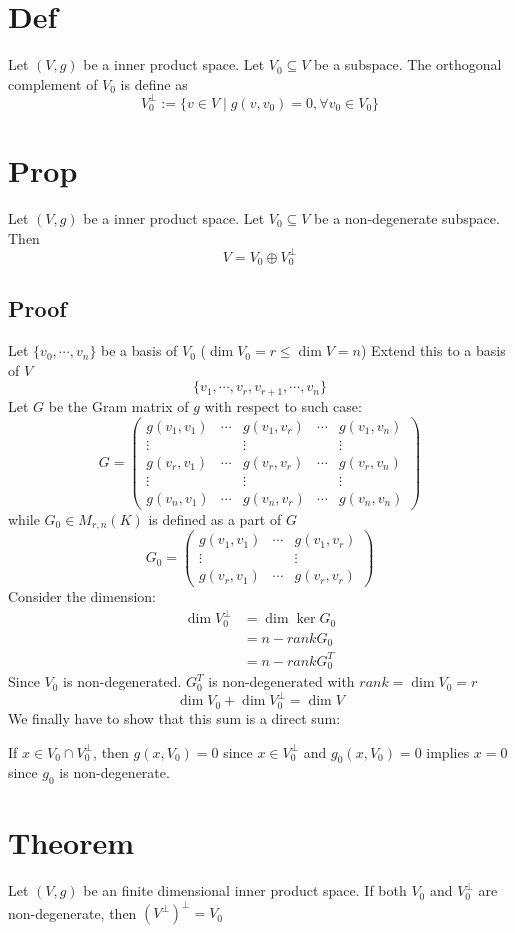 \documentclass{book}
\begin{document}
\section{Def}
Let $(V,g)$ be a inner product space. Let $V_0\subseteq V$ be a subspace. The orthogonal complement of $V_0$ is define as
$$V_0^\bot:=\{v\in V\mid g(v,v_0)=0,\forall v_0\in V_0\}$$
\section{Prop}
Let $(V,g)$ be a inner product space. Let $V_0\subseteq V$ be a non-degenerate subspace. Then$$V=V_0\oplus V_0^\bot$$
\subsection*{Proof}
Let $\{v_0,\cdots,v_n\}$ be a basis of $V_0$ ($\dim V_0=r\leq\dim V=n$) Extend this to a basis of $V$$$\{v_1,\cdots,v_r,v_{r+1},\cdots,v_n\}$$
Let $G$ be the Gram matrix of $g$ with respect to such case:
$$G=\begin{pmatrix}
    g(v_1,v_1)&\cdots&g(v_1,v_r)&\cdots&g(v_1,v_n)\\
    \vdots&&\vdots&&\vdots\\
    g(v_r,v_1)&\cdots&g(v_r,v_r)&\cdots&g(v_r,v_n)\\
    \vdots&&\vdots&&\vdots\\
    g(v_n,v_1)&\cdots&g(v_n,v_r)&\cdots&g(v_n,v_n)
\end{pmatrix}$$
while $G_0\in M_{r,n}(K)$ is defined as a part of $G$
$$G_0=\begin{pmatrix}
    g(v_1,v_1)&\cdots&g(v_1,v_r)\\
    \vdots&&\vdots\\
    g(v_r,v_1)&\cdots&g(v_r,v_r)
\end{pmatrix}$$
Consider the dimension:
$$\begin{aligned}
    \dim V_0^\bot &=\dim \ker G_0\\
    &=n-rank G_0\\
    &=n-rank G_0^T
\end{aligned}$$
Since $V_0$ is non-degenerated. $G_0^T$ is non-degenerated with $rank=\dim V_0=r$
$$\dim V_0+\dim V_0^\bot=\dim V$$
We finally have to show that this sum is a direct sum:

If $x\in V_0\cap V_0^\bot$, then $g(x,V_0)=0$ since $x\in V_0^\bot$ and $g_0(x,V_0)=0$ implies $x=0$ since $g_0$ is non-degenerate.
\section{Theorem}
Let $(V,g)$ be an finite dimensional inner product space. If both $V_0$ and $V_0^\bot$ are non-degenerate, then $(V^\bot)^\bot=V_0$
\end{document}
